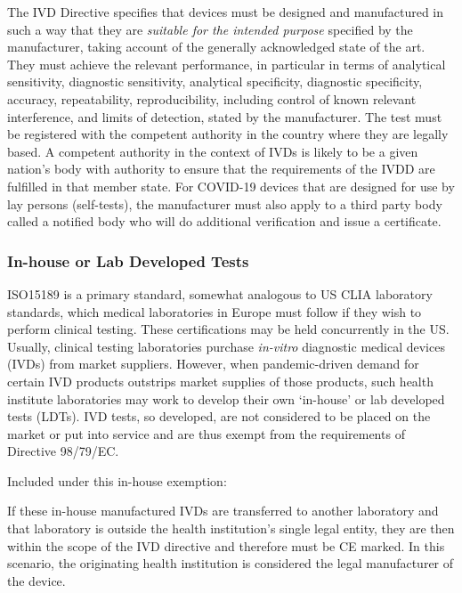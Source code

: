             The IVD Directive specifies that devices must be designed and manufactured in such a way that they are \emph{suitable for the intended purpose} specified by the manufacturer, taking account of the generally acknowledged state of the art. They must achieve the relevant performance, in particular in terms of analytical sensitivity, diagnostic sensitivity, analytical specificity, diagnostic specificity, accuracy, repeatability, reproducibility, including control of known relevant interference, and limits of detection, stated by the manufacturer. The test must be registered with the competent authority in the country where they are legally based. A competent authority in the context of IVDs is likely to be a given nation's body with authority to ensure that the requirements of the IVDD are fulfilled in that member state. For COVID-19 devices that are designed for use by lay persons (self-tests), the manufacturer must also apply to a third party body called a notified body who will do additional verification and issue a certificate.

        \subsubsection{In-house or Lab Developed Tests}

            ISO15189 is a primary standard, somewhat analogous to US CLIA laboratory standards, which medical laboratories in Europe must follow if they wish to perform clinical testing. These certifications may be held concurrently in the US.\cite{Schneier2017} Usually, clinical testing laboratories purchase \emph{in-vitro} diagnostic medical devices (IVDs) from market suppliers. However, when pandemic-driven demand for certain IVD products outstrips market supplies of those products, such health institute laboratories may work to develop their own ‘in-house’ or lab developed tests (LDTs). IVD tests, so developed, are not considered to be placed on the market or put into service and are thus exempt from the requirements of Directive 98/79/EC.

            Included under this in-house exemption:
            

            If these in-house manufactured IVDs are transferred to another laboratory and that laboratory is outside the health institution’s single legal entity, they are then within the scope of the IVD directive and therefore must be CE marked.  In this scenario, the originating health institution is considered the legal manufacturer of the device.\cite{Nolan2020}

